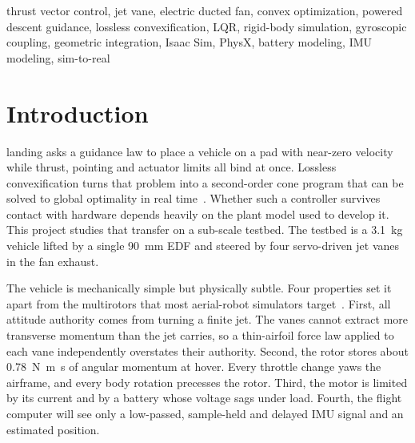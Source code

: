 \documentclass[journal]{IEEEtran}
\begin{document}
\begin{abstract}
The production planner lands from an offset start in 15 SOCPs and about \SI{70}{\milli\second}.
Its energy optimum sits at the edge of feasibility, because hover power dominates.
The earlier proportional-derivative attitude law is unstable on the corrected plant above 67\% rotor speed, where the LQR is stable.
The review corrects an omitted internal-duct Coriolis term and a misplaced intake station, makes sensor-latency rounding at the \SI{120}{\hertz} mission step explicit, and guards the planner against a convexification gap that the thrust-rate bound opens in 20\% of dispersed feasible starts.
It also lists the parameters that must be identified on hardware, among them the nozzle jet speed, which the plant takes from an open-rotor relation.
\end{abstract}

\begin{IEEEkeywords}
thrust vector control, jet vane, electric ducted fan, convex optimization, powered descent guidance, lossless convexification, LQR, rigid-body simulation, gyroscopic coupling, geometric integration, Isaac Sim, PhysX, battery modeling, IMU modeling, sim-to-real
\end{IEEEkeywords}

\section{Introduction}
\label{sec:intro}

 landing asks a guidance law to place a vehicle on a pad with near-zero velocity while thrust, pointing and actuator limits all bind at once.
Lossless convexification turns that problem into a second-order cone program that can be solved to global optimality in real time~\cite{acikmese2007}.
Whether such a controller survives contact with hardware depends heavily on the plant model used to develop it.
This project studies that transfer on a sub-scale testbed.
The testbed is a \SI{3.1}{\kilogram} vehicle lifted by a single \SI{90}{\milli\metre} EDF and steered by four servo-driven jet vanes in the fan exhaust.

The vehicle is mechanically simple but physically subtle.
Four properties set it apart from the multirotors that most aerial-robot simulators target~\cite{furrer2016rotors,song2020flightmare,shah2018airsim,panerati2021gym}.
First, all attitude authority comes from turning a finite jet.
The vanes cannot extract more transverse momentum than the jet carries, so a thin-airfoil force law applied to each vane independently overstates their authority.
Second, the rotor stores about \SI{0.78}{\newton\metre\second} of angular momentum at hover.
Every throttle change yaws the airframe, and every body rotation precesses the rotor.
Third, the motor is limited by its current and by a battery whose voltage sags under load.
Fourth, the flight computer will see only a low-passed, sample-held and delayed IMU signal and an estimated position.
\end{document}
